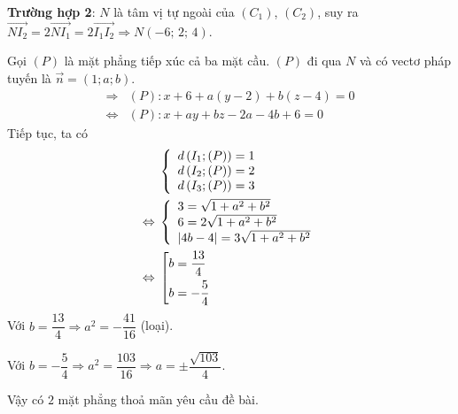 \begin{ex}
{{	\noindent \textbf{Trường hợp 2}: $N$ là tâm vị tự ngoài của $(C_1)$, $(C_2)$, suy ra $\overrightarrow {N{I_2}}  = 2\overrightarrow {N{I_1}}  = 2\overrightarrow {{I_1}{I_2}}  \Rightarrow N\left( { - 6;\,2;\,4} \right)$.
	}{}
	\noindent Gọi $(P)$ là mặt phẳng tiếp xúc cả ba mặt cầu. $(P)$ đi qua $N$ và có vectơ pháp tuyến là $\overrightarrow n = (1;a;b)$.
	\begin{align*}
		\Rightarrow{} &\left( P \right) \colon x + 6 + a\left( {y - 2} \right) + b\left( {z - 4} \right) = 0 \\
		\Leftrightarrow{} &\left( P \right) \colon x + ay + bz - 2a - 4b + 6 = 0
	\end{align*}
	\noindent Tiếp tục, ta có
	\begin{align*}
		&\left\{ {\begin{array}{l}
				{d\left( {{I_1};(P)} \right) = 1} \\ 
				{d\left( {{I_2};(P)} \right) = 2} \\ 
				{d\left( {{I_3};(P)} \right) = 3} 
		\end{array}} \right. \\
		\Leftrightarrow{} &\left\{ \begin{array}{l}
			3 = \sqrt {1 + {a^2} + {b^2}} \\
			6 = 2\sqrt {1 + {a^2} + {b^2}} \\
			\left| {4b - 4} \right| = 3\sqrt {1 + {a^2} + {b^2}}  \hfill \\ 
		\end{array}  \right. \\
		\Leftrightarrow{} &\left[ \begin{gathered}
			b = \frac{{13}}{4} \hfill \\
			b =  - \frac{5}{4} \hfill \\ 
		\end{gathered}  \right.
	\end{align*}
	\noindent Với $b = \dfrac{13}{4} \Rightarrow a^2 = -\dfrac{41}{16}$ (loại).
	
	\noindent Với $b = -\dfrac{5}{4} \Rightarrow {a^2} = \dfrac{{103}}{{16}} \Rightarrow a =  \pm \dfrac{{\sqrt {103} }}{4}$.
	
	\noindent Vậy có $2$ mặt phẳng thoả mãn yêu cầu đề bài.
	}
\end{ex}
